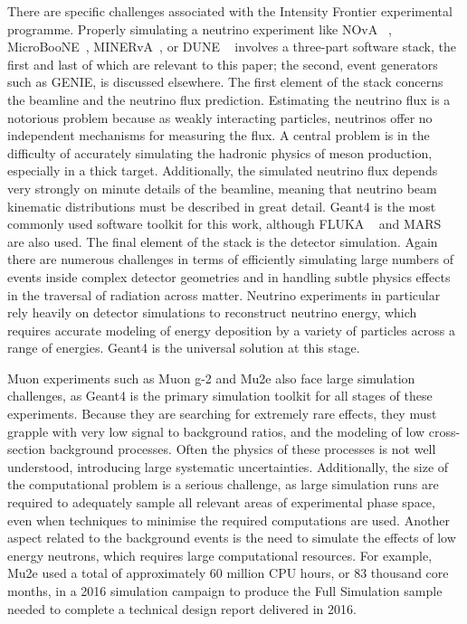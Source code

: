 \documentclass[12pt,a4paper]{article}
\begin{document}
There are specific challenges associated with the Intensity Frontier
experimental programme. Properly simulating a neutrino experiment like
NOvA ~\cite{Adamson:2016tbq}, MicroBooNE~\cite{MicroBooNE}, 
MINERvA~\cite{Aliaga:2013uqz}, or DUNE ~\cite{Acciarri:2015uup}
involves a three-part software stack, the first and last of which are
relevant to this paper; the second, event generators such as GENIE, 
is discussed elsewhere. The first element of the stack concerns
the beamline and the neutrino flux prediction. Estimating the neutrino
flux is a notorious problem because as weakly interacting particles,
neutrinos offer no independent mechanisms for measuring the flux. A
central problem is in the difficulty of accurately simulating the
hadronic physics of meson production, especially in a thick target.
Additionally, the simulated neutrino flux depends very strongly on
minute details of the beamline, meaning that neutrino beam kinematic
distributions must be described in great detail. Geant4 is the most
commonly used software toolkit for this work, although FLUKA ~\cite{Ferrari:2005zk} 
and MARS ~\cite{MARS} are also used. The final element of the stack is the
detector simulation. Again there are numerous challenges in terms of
efficiently simulating large numbers of events inside complex detector
geometries and in handling subtle physics effects in the traversal of
radiation across matter. Neutrino experiments in particular rely heavily
on detector simulations to reconstruct neutrino energy, which requires
accurate modeling of energy deposition by a variety of particles across
a range of energies. Geant4 is the universal solution at this stage.

Muon experiments such as Muon g-2 and Mu2e also face large simulation
challenges, as Geant4 is the primary simulation toolkit for
all stages of these experiments. Because they are searching for extremely rare effects, they
must grapple with very low signal to background ratios, and the modeling
of low cross-section background processes. Often the physics of these
processes is not well understood, introducing large systematic
uncertainties. Additionally, the size of the computational problem is a
serious challenge, as large simulation runs are required to adequately
sample all relevant areas of experimental phase space, even when
techniques to minimise the required computations are used. Another
aspect related to the background events is the need to simulate the
effects of low energy neutrons, which requires large computational
resources. For example, Mu2e used a total of approximately 60 million
CPU hours, or 83 thousand core months, in a 2016 simulation campaign to
produce the Full Simulation sample needed to complete a technical design
report delivered in 2016. 
\end{document}
